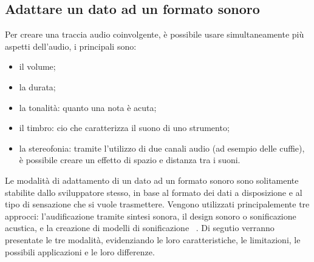 \subsection{Adattare un dato ad un formato sonoro}
Per creare una traccia audio coinvolgente, è possibile usare simultaneamente più aspetti dell'audio, i principali sono:
\begin{itemize}
  \item{il volume;}
  \item{la durata;}
  \item{la tonalità: quanto una nota è acuta;}
  \item{il timbro: cio che caratterizza il suono di uno strumento;}
  \item{la stereofonia: tramite l'utilizzo di due canali audio (ad esempio delle cuffie), è possibile creare un effetto di spazio e distanza tra i suoni.}
\end{itemize}
Le modalità di adattamento di un dato ad un formato sonoro sono solitamente stabilite dallo sviluppatore stesso, in base al formato dei dati a disposizione e al tipo di sensazione che si vuole trasmettere.
Vengono utilizzati principalemente tre approcci: l'audificazione tramite sintesi sonora, il design sonoro o sonificazione acustica, e la creazione di modelli di sonificazione ~\cite{soni_temporal}.
Di segutio verranno presentate le tre modalità, evidenziando le loro caratteristiche, le limitazioni, le possibili applicazioni e le loro differenze.
